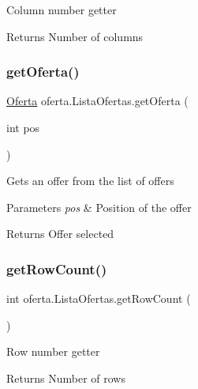 Column number getter \begin{DoxyReturn}{Returns}
Number of columns 
\end{DoxyReturn}
\mbox{\label{classoferta_1_1_lista_ofertas_aff266896ffa3bb5682ef4ecf1d514f2e}} 
\subsubsection{\texorpdfstring{get\+Oferta()}{getOferta()}}
{\footnotesize\ttfamily \mbox{\hyperlink{classoferta_1_1_oferta}{Oferta}} oferta.\+Lista\+Ofertas.\+get\+Oferta (\begin{DoxyParamCaption}\item[{int}]{pos }\end{DoxyParamCaption})\hspace{0.3cm}{\ttfamily [inline]}}

Gets an offer from the list of offers 
\begin{DoxyParams}{Parameters}
{\em pos} & Position of the offer \\
\hline
\end{DoxyParams}
\begin{DoxyReturn}{Returns}
Offer selected 
\end{DoxyReturn}
\mbox{\label{classoferta_1_1_lista_ofertas_af98f5114e3dc3f259ec55a2ab865c1af}} 
\subsubsection{\texorpdfstring{get\+Row\+Count()}{getRowCount()}}
{\footnotesize\ttfamily int oferta.\+Lista\+Ofertas.\+get\+Row\+Count (\begin{DoxyParamCaption}{ }\end{DoxyParamCaption})\hspace{0.3cm}{\ttfamily [inline]}}

Row number getter \begin{DoxyReturn}{Returns}
Number of rows 
\end{DoxyReturn}
\mbox{\label{classoferta_1_1_lista_ofertas_a31d3834ba593c933f612572a942fc601}} 
